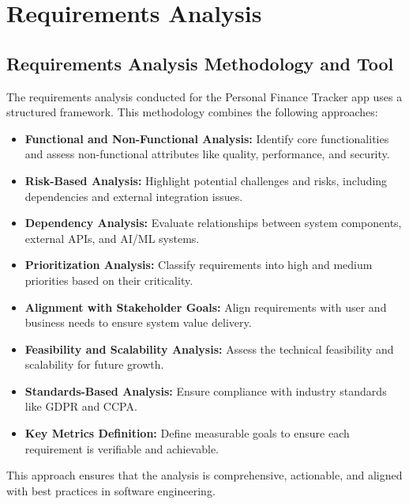 \newpage
\section{Requirements Analysis}

\subsection{Requirements Analysis Methodology and Tool}
The requirements analysis conducted for the Personal Finance Tracker app uses a structured framework. This methodology combines the following approaches:
\begin{itemize}
    \item \textbf{Functional and Non-Functional Analysis:} Identify core functionalities and assess non-functional attributes like quality, performance, and security.
    \item \textbf{Risk-Based Analysis:} Highlight potential challenges and risks, including dependencies and external integration issues.
    \item \textbf{Dependency Analysis:} Evaluate relationships between system components, external APIs, and AI/ML systems.
    \item \textbf{Prioritization Analysis:} Classify requirements into high and medium priorities based on their criticality.
    \item \textbf{Alignment with Stakeholder Goals:} Align requirements with user and business needs to ensure system value delivery.
    \item \textbf{Feasibility and Scalability Analysis:} Assess the technical feasibility and scalability for future growth.
    \item \textbf{Standards-Based Analysis:} Ensure compliance with industry standards like GDPR and CCPA.
    \item \textbf{Key Metrics Definition:} Define measurable goals to ensure each requirement is verifiable and achievable.
\end{itemize}
This approach ensures that the analysis is comprehensive, actionable, and aligned with best practices in software engineering.

